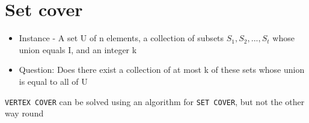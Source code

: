 \documentclass{article}[18pt]
\begin{document}
\section{Set cover}
\begin{itemize}
	\item Instance - A set U of n elements, a collection of subsets $S_1,S_2,...,S_t$ whose union equals I, and an integer k
	\item Question: Does there exist a collection of at most k of these sets whose union is equal to all of U
\end{itemize}
\texttt{VERTEX COVER} can be solved using an algorithm for \texttt{SET COVER}, but not the other way round
\end{document}
